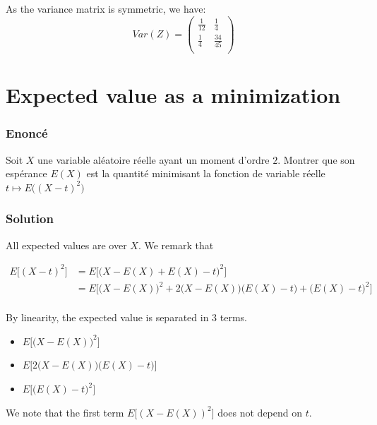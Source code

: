 \documentclass[
10pt, %
a4paper, %
oneside, %
headinclude,footinclude, %
BCOR5mm, %
]{scrartcl}
\begin{document}
As the variance matrix is symmetric, we have:
\begin{equation*}
    Var(Z) = 
\begin{pmatrix}
    \frac{1}{12}   & \frac{1}{4}  \\
    \frac{1}{4}   & \frac{34}{45}  \\
\end{pmatrix}
\end{equation*}

\section{\large\color{Blue}Expected value as a minimization}

\subsubsection{Enoncé}%
\label{ssub:Enoncé}

Soit $X$ une variable aléatoire réelle ayant un moment d'ordre $2$. Montrer que
son espérance $E(X)$ est la quantité minimisant la fonction de variable réelle $t\mapsto E\big( (X-t)^2 \big)$

\subsubsection{Solution}%
\label{ssub:Solution}

All expected values are over $X$. We remark that

\begin{equation*}
    \begin{aligned}
	E\Big[(X-t)^2 \Big]&= E\Big[\big(X-E(X)+E(X)-t\big)^2 \Big]\\
	&=E\Big[\big(X-E(X)\big)^2+2\big(X-E(X)\big)\big(E(X)-t\big)+\big(E(X)-t\big)^2 \Big]\\
    \end{aligned}
\end{equation*}

By linearity, the expected value is separated in $3$ terms.

\begin{itemize}
    \item $E\Big[\big(X-E(X)\big)^2\Big]$
    \item $E\Big[2\big(X-E(X)\big)\big(E(X)-t\big)\Big]$
    \item $E\Big[\big(E(X)-t\big)^2\Big]$
\end{itemize}

We note that the first term $E\Big[(X-E(X))^2\Big]$ does not depend on $t$.
\end{document}
